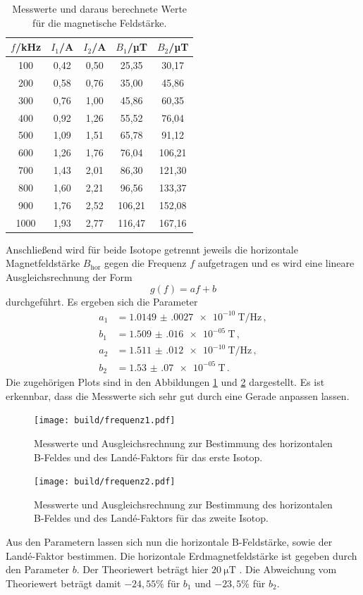 \begin{table}[htp]
	\begin{center}
    \caption{Messwerte und daraus berechnete Werte für die magnetische Feldstärke.}
    \label{tab:werte}
		\begin{tabular}{ccccc}
		\toprule
			{$f$/kHz} & {$I_1$/A} & {$I_2$/A} & {$B_1$/µT} & {$B_2$/µT}\\
			\midrule
			100 & 0,42 & 0,50 & 25,35 & 30,17\\
			200 & 0,58 & 0,76 & 35,00 & 45,86\\
			300 & 0,76 & 1,00 & 45,86 & 60,35\\
			400 & 0,92 & 1,26 & 55,52 & 76,04\\
			500 & 1,09 & 1,51 & 65,78 & 91,12\\
			600 & 1,26 & 1,76 & 76,04 & 106,21\\
			700 & 1,43 & 2,01 & 86,30 & 121,30\\
			800 & 1,60 & 2,21 & 96,56 & 133,37\\
			900 & 1,76 & 2,52 & 106,21 & 152,08\\
			1000 & 1,93 & 2,77 & 116,47 & 167,16\\
		\bottomrule
		\end{tabular}
	\end{center}
\end{table}

Anschließend wird für beide Isotope getrennt jeweils die horizontale Magnetfeldstärke $B_{\text{hor}}$
gegen die Frequenz $f$ aufgetragen und es wird eine lineare Ausgleichsrechnung der Form
\begin{equation*}
  g(f)=af+b
\end{equation*}
durchgeführt. Es ergeben sich die Parameter
\begin{align*}
 a_1&= \SI{1.0149(0027)e-10}{\tesla\per\Hz}  \,,\\
 b_1&= \SI{1.509(016)e-05}{\tesla} \,,\\
 a_2&= \SI{1.511(012)e-10}{\tesla\per\Hz} \,,\\
 b_2&= \SI{1.53(07)e-05}{\tesla} \,.
\end{align*}
Die zugehörigen Plots sind in den Abbildungen \ref{fig:frequenz1} und \ref{fig:frequenz2} dargestellt.
Es ist erkennbar, dass die Messwerte sich sehr gut durch eine Gerade anpassen lassen.
\begin{figure}
  \centering
  \texttt{[image: build/frequenz1.pdf]}
  \caption{Messwerte und Ausgleichsrechnung zur Bestimmung des horizontalen B-Feldes und des Landé-Faktors für
  das erste Isotop.}
  \label{fig:frequenz1}
\end{figure}
\begin{figure}
  \centering
  \texttt{[image: build/frequenz2.pdf]}
  \caption{Messwerte und Ausgleichsrechnung zur Bestimmung des horizontalen B-Feldes und des Landé-Faktors für
  das zweite Isotop.}
  \label{fig:frequenz2}
\end{figure}
Aus den Parametern lassen sich nun die horizontale B-Feldstärke, sowie der Landé-Faktor bestimmen.
Die horizontale Erdmagnetfeldstärke ist gegeben durch den Parameter $b$. Der Theoriewert beträgt hier
$\SI{20}{\micro\tesla}$ \cite{erde}. Die Abweichung vom Theoriewert beträgt damit $-24{,}55\%$ für
$b_1$ und $-23{,}5\%$ für $b_2$.

